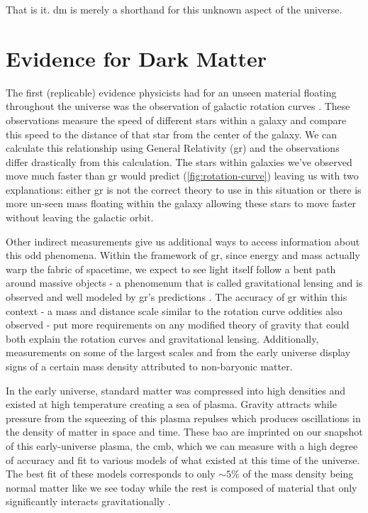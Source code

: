 That is it. \ac{dm} is merely a shorthand for this unknown aspect of the universe.

\section{Evidence for Dark Matter}
\label{sec:dm:evidence}

The first (replicable) evidence physicists had for an unseen material floating throughout the universe was the
observation of galactic rotation curves \cite{rubin-rotationcurve-1980,rotationcurve-2000}. These
observations measure the speed of different stars within a galaxy and compare this speed to the
distance of that star from the center of the galaxy. We can calculate this relationship using
General Relativity (\ac{gr}) \cite{rotationcurve-predictions-2007} and the observations differ drastically from this
calculation. The stars within galaxies we've observed move much faster than \ac{gr} would predict
(\cref{fig:rotation-curve}) leaving us with two explanations: either \ac{gr} is not the correct
theory to use in this situation or there is more un-seen mass floating within the galaxy allowing
these stars to move faster without leaving the galactic orbit.

Other indirect measurements give us additional ways to access information about this odd phenomena.
Within the framework of \ac{gr}, since energy and mass actually warp the fabric of spacetime, we
expect to see light itself follow a bent path around massive objects - a phenomenum that is called
gravitational lensing and is observed and well modeled by \ac{gr}'s predictions \cite{gravlensing-2004}.
The accuracy of \ac{gr} within this context - a mass and distance scale similar to the rotation
curve oddities also observed - put more requirements on any modified theory of gravity that could
both explain the rotation curves and gravitational lensing. Additionally, measurements on some of
the largest scales and from the early universe display signs of a certain mass density attributed
to non-baryonic matter. 

In the early universe, standard matter was compressed into high densities and existed at high
temperature creating a sea of plasma. Gravity attracts while pressure from the squeezing of this
plasma repulses which produces oscillations in the density of matter in space and time.
These \ac{bao} are imprinted on our snapshot of this early-universe plasma, the 
\ac{cmb}, which we can measure with a high degree
of accuracy and fit to various models of what existed at this time of the universe. The best fit of
these models corresponds to only $\sim 5\%$ of the mass density being normal matter like we see
today while the rest is composed of material that only significantly interacts gravitationally
\cite{planck-cmb-2015}.

